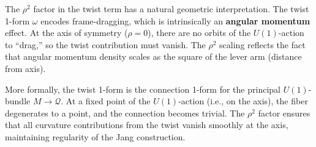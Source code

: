 \begin{remark}\label{rem:rho-squared-geometric}
The $\rho^2$ factor in the twist term has a natural geometric interpretation. The twist 1-form $\omega$ encodes frame-dragging, which is intrinsically an \textbf{angular momentum} effect. At the axis of symmetry ($\rho = 0$), there are no orbits of the $U(1)$-action to ``drag,'' so the twist contribution must vanish. The $\rho^2$ scaling reflects the fact that angular momentum density scales as the square of the lever arm (distance from axis).

More formally, the twist 1-form is the connection 1-form for the principal $U(1)$-bundle $M \to \mathcal{Q}$. At a fixed point of the $U(1)$-action (i.e., on the axis), the fiber degenerates to a point, and the connection becomes trivial. The $\rho^2$ factor ensures that all curvature contributions from the twist vanish smoothly at the axis, maintaining regularity of the Jang construction.
\end{remark}

